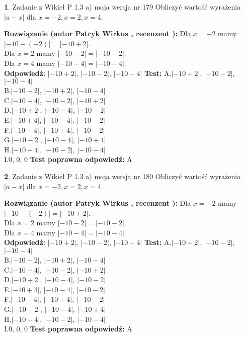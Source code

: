 \documentclass[12pt, a4paper]{article}
\theoremstyle{definition} %
\newtheorem{zad}{}
\newcommand{\zadStart}[1]{\begin{zad}#1\newline}
\newcommand{\zadStop}{\end{zad}}
\newcommand{\rozwStart}[2]{\noindent \textbf{Rozwiązanie (autor #1 , recenzent #2): }\newline}
\newcommand{\rozwStop}{\newline}
\newcommand{\odpStart}{\noindent \textbf{Odpowiedź:}\newline}
\newcommand{\odpStop}{\newline}
\newcommand{\testStart}{\noindent \textbf{Test:}\newline}
\newcommand{\testStop}{\newline}
\newcommand{\kluczStart}{\noindent \textbf{Test poprawna odpowiedź:}\newline}
\newcommand{\kluczStop}{\newline}
\begin{document}
\zadStart{Zadanie z Wikieł P 1.3 a) moja wersja nr 179}
Obliczyć wartość wyrażenia $|a - x|$ dla $x=-2,x=2,x=4$.
\zadStop
\rozwStart{Patryk Wirkus}{}
Dla $x = -2$ mamy $|-10 - (-2)| = |-10 + 2|$.\\
Dla $x = 2$ mamy $|-10 - 2| = |-10 - 2|$.\\
Dla $x = 4$ mamy $|-10 - 4| = |-10 - 4|$.\\
\rozwStop
\odpStart
$|-10 + 2|$, $|-10 - 2|$, $|-10 - 4|$
\odpStop
\testStart
A.$|-10 + 2|$, $|-10 - 2|$, $|-10 - 4|$\\
B.$|-10 - 2|$, $|-10 + 2|$, $|-10 - 4|$\\
C.$|-10 - 4|$, $|-10 - 2|$, $|-10 + 2|$\\
D.$|-10 + 2|$, $|-10 - 4|$, $|-10 - 2|$\\
E.$|-10 + 4|$, $|-10 - 4|$, $|-10 - 2|$\\
F.$|-10 - 4|$, $|-10 + 4|$, $|-10 - 2|$\\
G.$|-10 - 2|$, $|-10 - 4|$, $|-10 + 4|$\\
H.$|-10 + 4|$, $|-10 - 2|$, $|-10 - 4|$\\
I.$0$, $0$, $0$
\testStop
\kluczStart
A
\kluczStop



\zadStart{Zadanie z Wikieł P 1.3 a) moja wersja nr 180}
Obliczyć wartość wyrażenia $|a - x|$ dla $x=-2,x=2,x=4$.
\zadStop
\rozwStart{Patryk Wirkus}{}
Dla $x = -2$ mamy $|-10 - (-2)| = |-10 + 2|$.\\
Dla $x = 2$ mamy $|-10 - 2| = |-10 - 2|$.\\
Dla $x = 4$ mamy $|-10 - 4| = |-10 - 4|$.\\
\rozwStop
\odpStart
$|-10 + 2|$, $|-10 - 2|$, $|-10 - 4|$
\odpStop
\testStart
A.$|-10 + 2|$, $|-10 - 2|$, $|-10 - 4|$\\
B.$|-10 - 2|$, $|-10 + 2|$, $|-10 - 4|$\\
C.$|-10 - 4|$, $|-10 - 2|$, $|-10 + 2|$\\
D.$|-10 + 2|$, $|-10 - 4|$, $|-10 - 2|$\\
E.$|-10 + 4|$, $|-10 - 4|$, $|-10 - 2|$\\
F.$|-10 - 4|$, $|-10 + 4|$, $|-10 - 2|$\\
G.$|-10 - 2|$, $|-10 - 4|$, $|-10 + 4|$\\
H.$|-10 + 4|$, $|-10 - 2|$, $|-10 - 4|$\\
I.$0$, $0$, $0$
\testStop
\kluczStart
A
\kluczStop
\end{document}

